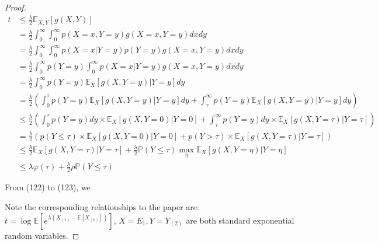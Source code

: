 \documentclass{article}
\theoremstyle{plain}
\begin{document}
\begin{proof}
\begin{align}
    t & \leq  \frac{\lambda}{2} \mathbb{E}_{X, Y}[g(X, Y)]\\
    & = \frac{\lambda}{2}\int _0^{\infty} \int_0^{\infty} p(X = x, Y = y) g(X = x, Y = y) dxdy\\
    & = \frac{\lambda}{2}\int _0^{\infty} \int_0^{\infty} p(X = x|Y = y) p(Y = y)g(X = x, Y = y) dxdy\\
    & = \frac{\lambda}{2}\int _0^{\infty} p(Y = y) \int_0^{\infty} p(X = x|Y = y) g(X = x, Y = y) dxdy\\
    & = \frac{\lambda}{2}\int _0^{\infty} p(Y = y) \mathbb{E}_X[g(X, Y = y)| Y = y]dy\\
    & = \frac{\lambda}{2}\left(\int _0^{\tau} p(Y = y) \mathbb{E}_X[g(X, Y = y)| Y = y]dy + \int _\tau^{\infty} p(Y = y) \mathbb{E}_X[g(X, Y = y)| Y = y]dy\right)\\
    & \leq \frac{\lambda}{2}\left(\int _0^{\tau} p(Y = y) dy \times \mathbb{E}_X[g(X, Y = 0)| Y = 0] + \int _\tau^{\infty} p(Y = y) dy \times \mathbb{E}_X[g(X, Y = \tau)| Y = \tau] \right)\\
    & = \frac{\lambda}{2}\left(p(Y \leq \tau) \times \mathbb{E}_X[g(X, Y = 0)| Y = 0] + p(Y > \tau) \times \mathbb{E}_X[g(X, Y = \tau)| Y = \tau] \right)\\
    & \leq \frac{\lambda}{2} \mathbb{E}_X[g(X, Y = \tau)|Y = \tau] + \frac{\lambda}{2} \mathbb{P}(Y \leq \tau) \max_{\eta} \mathbb{E}_X[g(X, Y = \eta)|Y = \eta]\\
    & \leq \lambda \varphi(\tau) + \frac{\lambda}{2} \rho \mathbb{P}(Y \leq \tau)
\end{align}

From (122) to (123), we

Note the corresponding relationships to the paper are:\\

$t = \log \mathbb{E} [e^{\lambda (X_{(1)} - \mathbb{E}[X_{(1)}])}]$, $X = E_1, Y = Y_{(2)}$ are both standard exponential random variables.
\end{proof}


\printbibliography
\end{document}
